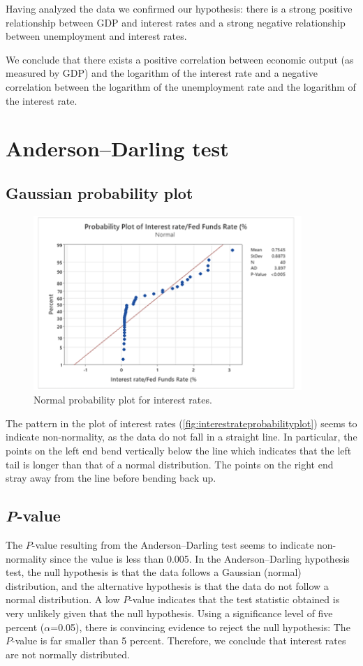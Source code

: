 \documentclass[12pt]{article}
\begin{document}
Having analyzed the data we confirmed our hypothesis: there is a strong positive relationship between GDP and interest rates and a strong negative relationship between unemployment and interest rates.

We conclude that there exists a positive correlation between economic output (as measured by GDP) and the logarithm of the interest rate and a negative correlation between the logarithm of the unemployment rate and the logarithm of the interest rate.

\section{Anderson--Darling test}
\subsection{Gaussian probability plot}
\begin{figure}[h]
\begin{center}
\includegraphics[width=4in]{images/interest-rate-probability-plot.png}
\end{center}
\caption{Normal probability plot for interest rates. \label{fig:interestrateprobabilityplot}}
\end{figure}
The pattern in the plot of interest rates (\autoref{fig:interestrateprobabilityplot}) seems to indicate non-normality, as the data do not fall in a straight line. In particular, the points on the left end bend vertically below the line which indicates that the left tail is longer than that of a normal distribution. The points on the right end stray away from the line before bending back up.
\subsection{\textit{P}-value}
The $P$-value resulting from the Anderson--Darling test seems to indicate non-normality since the value is less than 0.005. In the Anderson--Darling hypothesis test, the null hypothesis is that the data follows a Gaussian (normal) distribution, and the alternative hypothesis is that the data do not follow a normal distribution. A low $P$-value indicates that the test statistic obtained is very unlikely given that the null hypothesis. Using a significance level of five percent ($\alpha$=0.05), there is convincing evidence to reject the null hypothesis: The $P$-value is far smaller than 5 percent. Therefore, we conclude that interest rates are not normally distributed.
\end{document}

